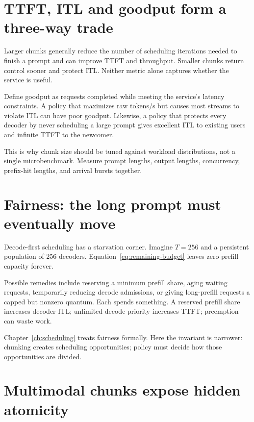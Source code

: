 
\section{TTFT, ITL and goodput form a three-way trade}

Larger chunks generally reduce the number of scheduling iterations needed to finish a
prompt and can improve TTFT and throughput. Smaller chunks return control sooner and
protect ITL. Neither metric alone captures whether the service is useful.

Define goodput as requests completed while meeting the service's latency constraints.
A policy that maximizes raw tokens/s but causes most streams to violate ITL can have
poor goodput. Likewise, a policy that protects every decoder by never scheduling a
large prompt gives excellent ITL to existing users and infinite TTFT to the newcomer.

This is why chunk size should be tuned against workload distributions, not a single
microbenchmark. Measure prompt lengths, output lengths, concurrency, prefix-hit
lengths, and arrival bursts together.

\section{Fairness: the long prompt must eventually move}

Decode-first scheduling has a starvation corner. Imagine $T=256$ and a persistent
population of 256 decoders. Equation~\ref{eq:remaining-budget} leaves zero prefill
capacity forever.

Possible remedies include reserving a minimum prefill share, aging waiting requests,
temporarily reducing decode admissions, or giving long-prefill requests a capped but
nonzero quantum. Each spends something. A reserved prefill share increases decoder
ITL; unlimited decode priority increases TTFT; preemption can waste work.

Chapter~\ref{ch:scheduling} treats fairness formally. Here the invariant is narrower:
chunking creates scheduling opportunities; policy must decide how those opportunities
are divided.

\section{Multimodal chunks expose hidden atomicity}

